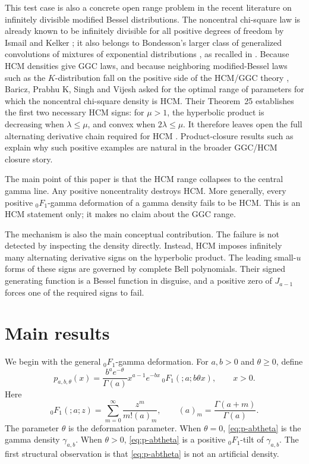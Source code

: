 ﻿\documentclass[preprint,12pt,authoryear]{elsarticle}
\begin{document}
This test case is also a concrete open range problem in the recent literature on infinitely divisible modified Bessel distributions.  The noncentral chi-square law is already known to be infinitely divisible for all positive degrees of freedom by Ismail and Kelker \cite[Theorem~1.6]{IsmailKelker1979}; it also belongs to Bondesson's larger class of generalized convolutions of mixtures of exponential distributions \cite[p.~43]{Bondesson1981}, as recalled in \cite[Section~4.2]{BariczPrabhuSinghVijesh2026}.  Because HCM densities give GGC laws, and because neighboring modified-Bessel laws such as the \(K\)-distribution fall on the positive side of the HCM/GGC theory \cite[Section~2.5]{BariczPrabhuSinghVijesh2026}, Baricz, Prabhu K, Singh and Vijesh asked for the optimal range of parameters for which the noncentral chi-square density is HCM.  Their Theorem~25 establishes the first two necessary HCM signs: for \(\mu>1\), the hyperbolic product is decreasing when \(\lambda\le\mu\), and convex when \(2\lambda\le\mu\).  It therefore leaves open the full alternating derivative chain required for HCM \cite[Section~4.2 and Theorem~25]{BariczPrabhuSinghVijesh2026}.  Product-closure results such as \cite{Bondesson2015} explain why such positive examples are natural in the broader GGC/HCM closure story.

The main point of this paper is that the HCM range collapses to the central gamma line.  Any positive noncentrality destroys HCM.  More generally, every positive \({}_0F_1\)-gamma deformation of a gamma density fails to be HCM.  This is an HCM statement only; it makes no claim about the GGC range.

The mechanism is also the main conceptual contribution.  The failure is not detected by inspecting the density directly.  Instead, HCM imposes infinitely many alternating derivative signs on the hyperbolic product.  The leading small-\(u\) forms of these signs are governed by complete Bell polynomials.  Their signed generating function is a Bessel function in disguise, and a positive zero of \(J_{a-1}\) forces one of the required signs to fail.

\section{Main results}

We begin with the general \({}_0F_1\)-gamma deformation.  For \(a,b>0\) and \(\theta\ge0\), define
\begin{equation}
\label{eq:p-abtheta}
p_{a,b,\theta}(x)
=
\frac{b^a e^{-\theta}}{\Gamma(a)}
x^{a-1}e^{-bx}\,{}_0F_1(;a;b\theta x),
\qquad x>0.
\end{equation}
Here
\begin{equation}
{}_0F_1(;a;z)
=
\sum_{m=0}^{\infty}\frac{z^m}{m!(a)_m},
\qquad
(a)_m=\frac{\Gamma(a+m)}{\Gamma(a)}.
\end{equation}
The parameter \(\theta\) is the deformation parameter.  When \(\theta=0\), \eqref{eq:p-abtheta} is the gamma density \(\gamma_{a,b}\).  When \(\theta>0\), \eqref{eq:p-abtheta} is a positive \({}_0F_1\)-tilt of \(\gamma_{a,b}\).  The first structural observation is that \eqref{eq:p-abtheta} is not an artificial density.
\end{document}
